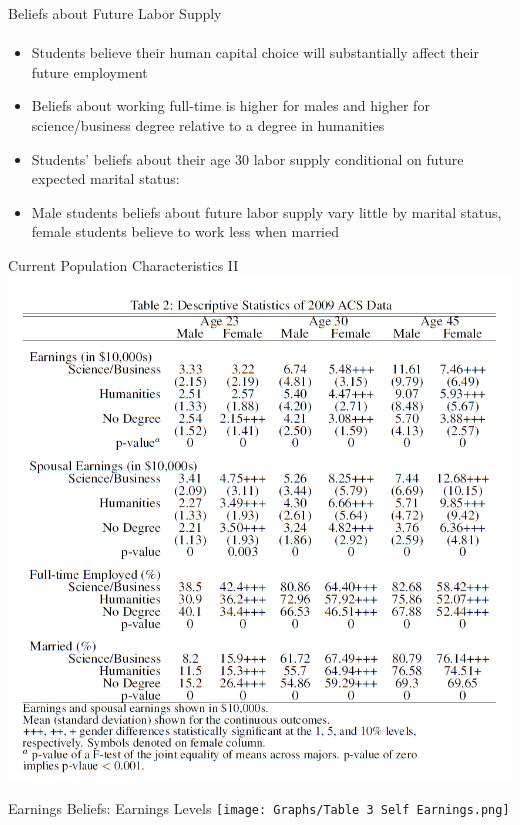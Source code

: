 \documentclass[12pt]{beamer}
\begin{document}
\begin{frame}{Beliefs about Future Labor Supply}
    \framesubtitle{} 
    \begin{itemize}
        \item Students believe their human capital choice will substantially affect their future employment
        \item Beliefs about working full-time is higher for males and higher for science/business degree relative to a degree in humanities
        \item Students' beliefs about their age 30 labor supply conditional on future expected marital status:
        \item Male students beliefs about future labor supply vary little by marital status, female students believe to work less when married
    \end{itemize}
\end{frame}

\begin{frame}{Current Population Characteristics II}
    \includegraphics[scale=0.4]{Table2.png}
\end{frame}

\begin{frame}{Earnings Beliefs: Earnings Levels}
    \texttt{[image: Graphs/Table 3 Self Earnings.png]}
\end{frame}
\end{document}
